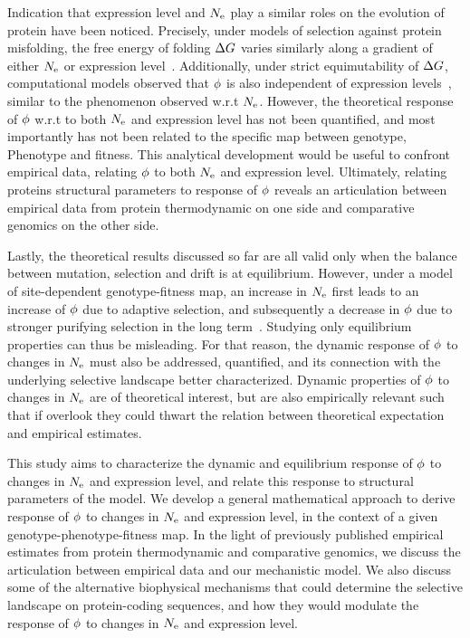 Indication that expression level and $N_{\mathrm{e}}$ play a similar roles on the evolution of protein have been noticed.
Precisely, under models of selection against protein misfolding, the free energy of folding $\Delta G$ varies similarly along a gradient of either $N_{\mathrm{e}}$ or expression level~\citep{Serohijos2013}.
Additionally, under strict equimutability of $\Delta G$, computational models observed that $\phi$ is also independent of expression levels~\citep{Serohijos2012}, similar to the phenomenon observed w.r.t $N_{\mathrm{e}}$.
However, the theoretical response of $\phi$ w.r.t to both $N_{\mathrm{e}}$ and expression level has not been quantified, and most importantly has not been related to the specific map between genotype, \gls{Phenotype} and fitness.
This analytical development would be useful to confront empirical data, relating $\phi$ to both $N_{\mathrm{e}}$ and expression level.
Ultimately, relating proteins structural parameters to response of $\phi$ reveals an articulation between empirical data from protein thermodynamic on one side and comparative genomics on the other side.

Lastly, the theoretical results discussed so far are all valid only when the balance between mutation, selection and drift is at equilibrium.
However, under a model of site-dependent genotype-fitness map, an increase in $N_{\mathrm{e}}$ first leads to an increase of $\phi$ due to adaptive selection, and subsequently a decrease in $\phi$ due to stronger purifying selection in the long term~\citep{Jones2016}.
Studying only equilibrium properties can thus be misleading.
For that reason, the dynamic response of $\phi$ to changes in $N_{\mathrm{e}}$ must also be addressed, quantified, and its connection with the underlying selective landscape better characterized.
Dynamic properties of $\phi$ to changes in $N_{\mathrm{e}}$ are of theoretical interest, but are also empirically relevant such that if overlook they could thwart the relation between theoretical expectation and empirical estimates.

This study aims to characterize the dynamic and equilibrium response of $\phi$ to changes in $N_{\mathrm{e}}$ and expression level, and relate this response to structural parameters of the model.
We develop a general mathematical approach to derive response of $\phi$ to changes in $N_{\mathrm{e}}$ and expression level, in the context of a given genotype-phenotype-fitness map.
In the light of previously published empirical estimates from protein thermodynamic and comparative genomics, we discuss the articulation between empirical data and our mechanistic model.
We also discuss some of the alternative biophysical mechanisms that could determine the selective landscape on protein-coding sequences, and how they would modulate the response of $\phi$ to changes in $N_{\mathrm{e}}$ and expression level.


